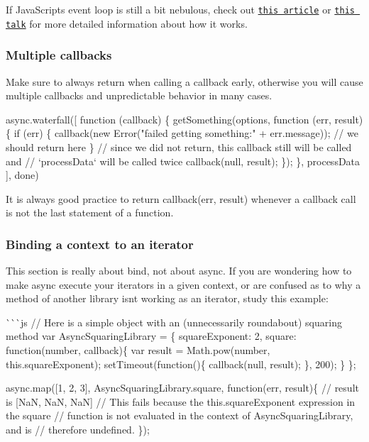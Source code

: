 If Java\+Script\textquotesingle{}s event loop is still a bit nebulous, check out \href{http://blog.carbonfive.com/2013/10/27/the-javascript-event-loop-explained/}{\tt this article} or \href{http://2014.jsconf.eu/speakers/philip-roberts-what-the-heck-is-the-event-loop-anyway.html}{\tt this talk} for more detailed information about how it works.

\subsubsection*{Multiple callbacks}

Make sure to always {\ttfamily return} when calling a callback early, otherwise you will cause multiple callbacks and unpredictable behavior in many cases.


\begin{DoxyCode}
async.waterfall([
    function (callback) \{
        getSomething(options, function (err, result) \{
          if (err) \{
            callback(new Error("failed getting something:" + err.message));
            // we should return here
          \}
          // since we did not return, this callback still will be called and
          // `processData` will be called twice
          callback(null, result);
        \});
    \},
    processData
], done)
\end{DoxyCode}


It is always good practice to {\ttfamily return callback(err, result)} whenever a callback call is not the last statement of a function.

\subsubsection*{Binding a context to an iterator}

This section is really about {\ttfamily bind}, not about {\ttfamily async}. If you are wondering how to make {\ttfamily async} execute your iterators in a given context, or are confused as to why a method of another library isn\textquotesingle{}t working as an iterator, study this example\+:

\`{}\`{}\`{}js // Here is a simple object with an (unnecessarily roundabout) squaring method var Async\+Squaring\+Library = \{ square\+Exponent\+: 2, square\+: function(number, callback)\{ var result = Math.\+pow(number, this.\+square\+Exponent); set\+Timeout(function()\{ callback(null, result); \}, 200); \} \};

async.\+map(\mbox{[}1, 2, 3\mbox{]}, Async\+Squaring\+Library.\+square, function(err, result)\{ // result is \mbox{[}NaN, NaN, NaN\mbox{]} // This fails because the {\ttfamily this.\+square\+Exponent} expression in the square // function is not evaluated in the context of Async\+Squaring\+Library, and is // therefore undefined. \});

